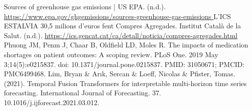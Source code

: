 \documentclass[11pt,twocolumn]{article}
\begin{document}
\begin{thebibliography}{}
	 Sources of greenhouse gas emissions | US EPA. (n.d.). \url{https://www.epa.gov/ghgemissions/sources-greenhouse-gas-emissions }
	 L’ICS ESTALVIA 30,5 milions d’euros fent Compres Agregades. Institut Català de la Salut. (n.d.). \url{https://ics.gencat.cat/ca/detall/noticia/compres-agregades.html}
	 Phuong JM, Penm J, Chaar B, Oldfield LD, Moles R. The impacts of medication shortages on patient outcomes: A scoping review. PLoS One. 2019 May 3;14(5):e0215837. doi: 10.1371/journal.pone.0215837. PMID: 31050671; PMCID: PMC6499468.
	 Lim, Bryan \& Arık, Sercan \& Loeff, Nicolas \& Pfister, Tomas. (2021). Temporal Fusion Transformers for interpretable multi-horizon time series forecasting. International Journal of Forecasting. 37. 10.1016/j.ijforecast.2021.03.012.
\end{thebibliography}
\end{document}
